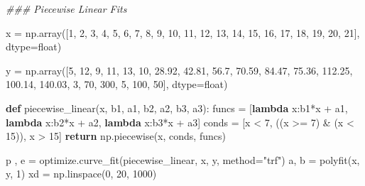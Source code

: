 \documentclass[]{tufte-book}
\newenvironment{Shaded}{}{}
\newcommand{\BuiltInTok}[1]{#1}
\newcommand{\CommentTok}[1]{\textcolor[rgb]{0.38,0.63,0.69}{\textit{#1}}}
\newcommand{\ControlFlowTok}[1]{\textcolor[rgb]{0.00,0.44,0.13}{\textbf{#1}}}
\newcommand{\DecValTok}[1]{\textcolor[rgb]{0.25,0.63,0.44}{#1}}
\newcommand{\FloatTok}[1]{\textcolor[rgb]{0.25,0.63,0.44}{#1}}
\newcommand{\KeywordTok}[1]{\textcolor[rgb]{0.00,0.44,0.13}{\textbf{#1}}}
\newcommand{\NormalTok}[1]{#1}
\newcommand{\OperatorTok}[1]{\textcolor[rgb]{0.40,0.40,0.40}{#1}}
\newcommand{\StringTok}[1]{\textcolor[rgb]{0.25,0.44,0.63}{#1}}
\theoremstyle{definition}
\theoremstyle{definition}
\theoremstyle{definition}
\theoremstyle{remark}
\begin{document}
\begin{Shaded}
\begin{Highlighting}[]
\CommentTok{\#\#\# Piecewise Linear Fits}

\NormalTok{x }\OperatorTok{=}\NormalTok{ np.array([}\DecValTok{1}\NormalTok{, }\DecValTok{2}\NormalTok{, }\DecValTok{3}\NormalTok{, }\DecValTok{4}\NormalTok{, }\DecValTok{5}\NormalTok{, }\DecValTok{6}\NormalTok{, }\DecValTok{7}\NormalTok{, }\DecValTok{8}\NormalTok{, }\DecValTok{9}\NormalTok{, }\DecValTok{10}\NormalTok{, }\DecValTok{11}\NormalTok{, }\DecValTok{12}\NormalTok{, }
\DecValTok{13}\NormalTok{, }\DecValTok{14}\NormalTok{, }\DecValTok{15}\NormalTok{, }\DecValTok{16}\NormalTok{, }\DecValTok{17}\NormalTok{, }\DecValTok{18}\NormalTok{, }\DecValTok{19}\NormalTok{, }\DecValTok{20}\NormalTok{, }\DecValTok{21}\NormalTok{],  dtype}\OperatorTok{=}\BuiltInTok{float}\NormalTok{)}

\NormalTok{y }\OperatorTok{=}\NormalTok{ np.array([}\DecValTok{5}\NormalTok{, }\DecValTok{12}\NormalTok{, }\DecValTok{9}\NormalTok{, }\DecValTok{11}\NormalTok{, }\DecValTok{13}\NormalTok{, }\DecValTok{10}\NormalTok{,}
              \FloatTok{28.92}\NormalTok{, }\FloatTok{42.81}\NormalTok{, }\FloatTok{56.7}\NormalTok{, }\FloatTok{70.59}\NormalTok{, }\FloatTok{84.47}\NormalTok{, }
              \FloatTok{75.36}\NormalTok{, }\FloatTok{112.25}\NormalTok{, }\FloatTok{100.14}\NormalTok{, }\FloatTok{140.03}\NormalTok{, }\DecValTok{3}\NormalTok{,}
              \DecValTok{70}\NormalTok{, }\DecValTok{300}\NormalTok{, }\DecValTok{5}\NormalTok{, }\DecValTok{100}\NormalTok{, }\DecValTok{50}\NormalTok{], dtype}\OperatorTok{=}\BuiltInTok{float}\NormalTok{)}

\KeywordTok{def}\NormalTok{ piecewise\_linear(x, b1, a1,  b2, a2, b3, a3):}
\NormalTok{    funcs }\OperatorTok{=}\NormalTok{ [}\KeywordTok{lambda}\NormalTok{ x:b1}\OperatorTok{*}\NormalTok{x }\OperatorTok{+}\NormalTok{ a1,}
             \KeywordTok{lambda}\NormalTok{ x:b2}\OperatorTok{*}\NormalTok{x }\OperatorTok{+}\NormalTok{ a2,}
             \KeywordTok{lambda}\NormalTok{ x:b3}\OperatorTok{*}\NormalTok{x }\OperatorTok{+}\NormalTok{ a3]}
\NormalTok{    conds }\OperatorTok{=}\NormalTok{ [x }\OperatorTok{\textless{}} \DecValTok{7}\NormalTok{, ((x }\OperatorTok{\textgreater{}=} \DecValTok{7}\NormalTok{) }\OperatorTok{\&}\NormalTok{ (x }\OperatorTok{\textless{}} \DecValTok{15}\NormalTok{)), x }\OperatorTok{\textgreater{}} \DecValTok{15}\NormalTok{]}
    \ControlFlowTok{return}\NormalTok{ np.piecewise(x, conds, funcs)}

\NormalTok{p , e }\OperatorTok{=}\NormalTok{ optimize.curve\_fit(piecewise\_linear, x, y, method}\OperatorTok{=}\StringTok{"trf"}\NormalTok{)}
\NormalTok{a, b }\OperatorTok{=}\NormalTok{ polyfit(x, y, }\DecValTok{1}\NormalTok{)}
\NormalTok{xd }\OperatorTok{=}\NormalTok{ np.linspace(}\DecValTok{0}\NormalTok{, }\DecValTok{20}\NormalTok{, }\DecValTok{1000}\NormalTok{)}


\end{Highlighting}
\end{Shaded}
\end{document}
